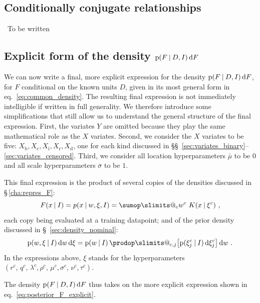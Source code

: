\documentclass[a4paper,12pt,%
onecolumn,oneside,article,%
british%
]{memoir}
\makeatletter
\def\sum{\DOTSI\sumop\slimits@}
\def\prod{\DOTSI\prodop\slimits@}
\newcommand*{\wrench}{{\fontencoding{U}\fontfamily{fontawesomethree}\selectfont\symbol{114}}}
\newcommand{\mynotew}[1]{{\footnotesize\color{notecolour}\wrench\ #1}}
\newcommand*{\di}{\mathop{}\!\mathrm{d}}%
\newcommand*{\p}{\mathrm{p}}%
\renewcommand*{\|}[1][]{\nonscript\:#1\vert\nonscript\:\mathopen{}}
\newcommand*{\sect}{\S}%
\newcommand*{\sects}{\S\S}%
\newcommand*{\eqn}{eq.}%
\newcommand*{\muo}{\bar{\mu}}
\newcommand*{\sigmao}{\bar{\sigma}}
\newcommand*{\vr}{\textrm{r}}
\newcommand*{\vd}{\textrm{d}}
\newcommand*{\vi}{\textrm{i}}
\newcommand*{\vb}{\textrm{b}}
\newcommand*{\vc}{\textrm{c}}
\makeatother
\begin{document}
\medskip

\subsection{Conditionally conjugate relationships}
\label{sec:condition_conj}

\mynotew{To be written}


\subsection{Explicit form of the density $\p(F \|D,I) \di F$}
\label{sec:explicit_posterion_F}

We can now write a final, more explicit expression for the density $\p(F \| D,I) \di F$, for $F$ conditional on the known units $D$, given in its most general form in \eqn~\eqref{eq:common_density}. The resulting final expression is not immediately intelligible if written in full generality. We therefore introduce some simplifications that still allow us to understand the general structure of the final expression. First, the variates $Y$ are omitted because they play the same mathematical role as the $X$ variates. Second, we consider the $X$ variates to be five: $X_{\vb},X_{\vc},X_{\vi},X_{\vr},X_{\vd}$, one for each kind discussed in \sects~\ref{sec:variates_binary}--\ref{sec:variates_censored}. Third, we consider all location hyperparameters $\muo$ to be $0$ and all scale hyperparameters $\sigmao$ to be $1$.

This final expression is the product of several copies of the densities discussed in \sect\,\ref{cha:repres_F}:
\begin{equation*}
  F(x \| I ) =
  p(x \| w, \xi, I ) =
  \sum_{c} w^{c}\ K(x \| \xi^{c}) \ ,
\end{equation*}
each copy being evaluated at a training datapoint; and of the prior density discussed in \sect~\ref{sec:density_nominal}:
\begin{equation*}
  \p(w, \xi \|I)
  \di w \di\xi =
  \p(w \|I)\,
  \prod_{c,j}\bigl[ \p(\xi^{c}_{j} \|I) \di\xi^{c}_{j}\bigr]
  \di w \ .
\end{equation*}
In the expressions above, $\xi$ stands for the hyperparameters $(r^{c},\, q^{c},\,
  \lambda^{c}, \rho^{c},\,
  \mu^{c}, \sigma^{c},\,
  \nu^{c}, \tau^{c})$.

The density $\p(F  \| D,I) \di F$ thus takes on the more explicit expression shown in \eqn~\eqref{eq:posterior_F_explicit}.
\end{document}
